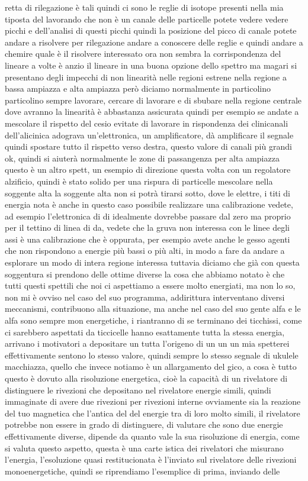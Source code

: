 retta di rilegazione è tali quindi ci sono le reglie di isotope presenti nella mia tiposta del lavorando che non è un canale delle particelle potete vedere vedere picchi e dell'analisi di questi picchi quindi la posizione del picco di canale potete andare a risolvere per rilegazione andare a conoscere delle reglie e quindi andare a chemire quale è il risolvere interessato ora non sembra la corrispondenza del lineare a volte è anzio il lineare in una buona opzione dello spettro ma magari si presentano degli impecchi di non linearità nelle regioni estrene nella regione a bassa ampiazza e alta ampiazza però diciamo normalmente in particolino particolino sempre lavorare, cercare di lavorare e di sbubare nella regione centrale dove avranno la linearità è abbastanza assicurata quindi per esempio se andate a mescolare il rispetto del cesio evitate di lavorare in rispondenza dei clinicanali dell'alicinica adograva un'elettronica, un amplificatore, dà amplificare il segnale quindi spostare tutto il rispetto verso destra, questo valore di canali più grandi ok, quindi si aiuterà normalmente le zone di passangenza per alta ampiazza questo è un altro spett, un esempio di direzione questa volta con un regolatore alzificio, quindi è stato solido per una rispura di particelle mescolare nella soggente alta la soggente alta non si potrà tirarsi sotto, dove le elettre, i titi di energia nota è anche in questo caso possibile realizzare una calibrazione vedete, ad esempio l'elettronica di di idealmente dovrebbe passare dal zero ma proprio per il tettino di linea di da, vedete che la gruva non interessa con le linee degli assi è una calibrazione che è oppurata, per esempio avete anche le gesso agenti che non rispondono a energie più bassi o più alti, in modo a fare da andare a esplorare un modo di intera regione interessa tuttavia diciamo che già con questa soggentura si prendono delle ottime diverse la cosa che abbiamo notato è che tutti questi spettili che noi ci aspettiamo a essere molto energiati, ma non lo so, non mi è ovviso nel caso del suo programma, addirittura interventano diversi meccanismi, contribuono alla situazione, ma anche nel caso del suo gente alfa e le alfa sono sempre mon energetiche, i riantranno di se terminano dei ticchissi, come ci sarebbero aspettati da ticcicelle hanno esattamente tutta la stessa energia, arrivano i motivatori a depositare un tutta l'origeno di un un un mia spetterei effettivamente sentono lo stesso valore, quindi sempre lo stesso segnale di ukulele macchiazza, quello che invece notiamo è un allargamento del gico, a cosa è tutto questo è dovuto alla risoluzione energetica, cioè la capacità di un rivelatore di distinguere le rivezioni che depositano nel rivelatore energie simili, quindi immaginate di avere due rivezioni per rivezioni interne ovviamente sia la reazione del tuo magnetica che l'antica del del energie tra di loro molto simili, il rivelatore potrebbe non essere in grado di distinguere, di valutare che sono due energie effettivamente diverse, dipende da quanto vale la sua risoluzione di energia, come si valuta questo aspetto, questa è una carte istica dei rivelatori che misurano l'energia, l'esoluzione quasi restitucionata è l'inviato sul rivelatore delle rivezioni monoenergetiche, quindi se riprendiamo l'esemplice di prima, inviando delle 